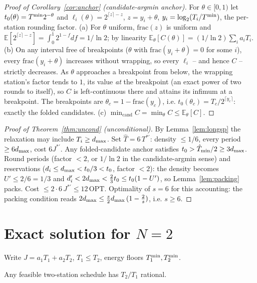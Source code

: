 \begin{proof}[Proof of Corollary~\ref{cor:anchor} (candidate-argmin anchor)]
For $\theta \in [0,1)$ let $t_0(\theta) = T^{\min} 2^{-\theta}$ and
$\ell_i(\theta) = 2^{\lceil z \rceil - z}$, $z = y_i + \theta$,
$y_i = \log_2(T_i/T^{\min})$, the per-station rounding factor.
(a) For $\theta$ uniform, $\mathrm{frac}(z)$ is uniform and
$\mathbb{E}[2^{\lceil z\rceil - z}] = \int_0^1 2^{1-f} df = 1/\ln 2$;
by linearity $\mathbb{E}_\theta[C(\theta)] = (1/\ln 2)\sum_i a_i T_i$.
(b) On any interval free of breakpoints
($\theta$ with $\mathrm{frac}(y_i + \theta) = 0$ for some $i$), every
$\mathrm{frac}(y_i+\theta)$ increases without wrapping, so every
$\ell_i$ -- and hence $C$ -- strictly decreases. As $\theta$ approaches a
breakpoint from below, the wrapping station's factor tends to $1$, its
value \emph{at} the breakpoint (an exact power of two rounds to itself),
so $C$ is left-continuous there and attains its infimum at a breakpoint.
The breakpoints are $\theta_c = 1 - \mathrm{frac}(y_c)$, i.e.
$t_0(\theta_c) = T_c/2^{\lceil y_c \rceil}$: exactly the folded
candidates. (c) $\min_{\mathrm{cand}} C = \min_\theta C \le
\mathbb{E}_\theta[C]$.
\end{proof}

\begin{proof}[Proof of Theorem~\ref{thm:uncond} (unconditional)]
By Lemma~\ref{lem:longsp} the relaxation may include $T_i \ge d_{\max}$. Set
$\hat T = 6\,T^{*\prime}$: density $\le 1/6$, every period $\ge 6d_{\max}$,
cost $6 J^{*\prime}$. Any folded-candidate anchor satisfies
$t_0 > \hat T_{\min}/2 \ge 3 d_{\max}$. Round periods (factor $<2$, or
$1/\ln 2$ in the candidate-argmin sense) and reservations
($d_i \le d_{\max} < t_0/3 < t_0$, factor $< 2$): the density becomes
$U' \le 2/6 = 1/3$ and $d'_i < 2d_{\max} < \tfrac23 t_0 \le t_0 (1 - U')$,
so Lemma~\ref{lem:packing} packs. Cost $\le 2 \cdot 6\, J^{*\prime} \le 12\,\mathrm{OPT}$.
Optimality of $s = 6$ for this accounting: the packing condition reads
$2d_{\max} \le \tfrac{s}{2}d_{\max}\,(1 - \tfrac{2}{s})$, i.e. $s \ge 6$.
\end{proof}

\section{Exact solution for $N = 2$}

Write $J = a_1 T_1 + a_2 T_2$, $T_1 \le T_2$, energy floors
$T^{\min}_1, T^{\min}_2$.

\begin{lemma}
\label{app:rational}
Any feasible two-station schedule has $T_2/T_1$ rational.
\end{lemma}

